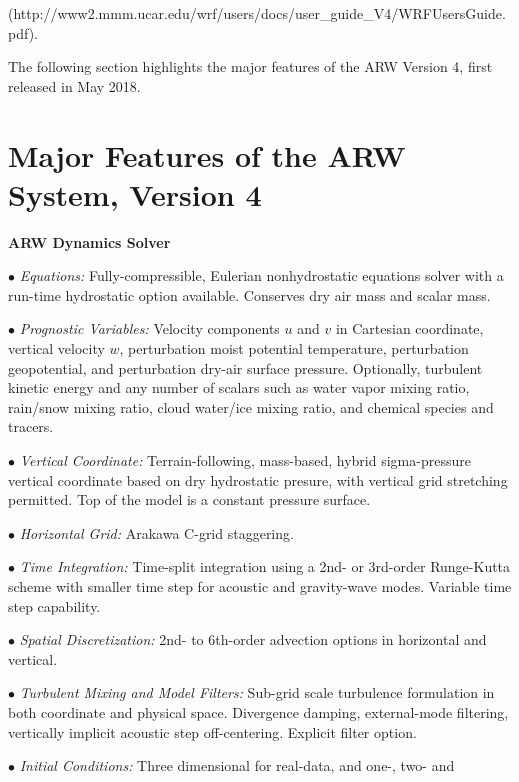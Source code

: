 {\noindent(http://www2.mmm.ucar.edu/wrf/users/docs/user\_guide\_V4/WRFUsersGuide.pdf).  }

The following section highlights the major features of the 
ARW Version 4, first released in May 2018.

\section {Major Features of the ARW System, Version 4}

\vskip 12pt
{\noindent\bf ARW Dynamics Solver}
\vskip 12pt

\begin{description}
\setlength{\itemsep}{-5pt}
\item{$\bullet$} {\em Equations:}
Fully-compressible, Eulerian nonhydrostatic equations solver with 
a run-time hydrostatic option available. Conserves dry air mass and scalar mass.
%
\item{$\bullet$} {\em Prognostic Variables:}
Velocity components $u$ and $v$ in Cartesian coordinate, vertical velocity $w$, 
perturbation moist potential temperature, perturbation geopotential, 
and perturbation dry-air surface pressure.
Optionally, turbulent kinetic energy and any number of scalars
such as water vapor mixing ratio, rain/snow mixing ratio,
cloud water/ice mixing ratio, and chemical species and tracers.
%
\item{$\bullet$} {\em Vertical Coordinate:}
Terrain-following, mass-based, hybrid sigma-pressure vertical coordinate based on dry hydrostatic presure, 
with vertical grid stretching permitted.
Top of the model is a constant pressure surface.
%
\item{$\bullet$} {\em Horizontal Grid:}
Arakawa C-grid staggering. 
%
\item{$\bullet$} {\em Time Integration:}
Time-split integration using a 2nd- or 3rd-order Runge-Kutta scheme with
smaller time step for acoustic and gravity-wave modes. 
Variable time step capability.
%
\item{$\bullet$} {\em Spatial Discretization:}
2nd- to 6th-order advection options in horizontal and vertical.
%
\item{$\bullet$} {\em Turbulent Mixing and Model Filters:} Sub-grid scale
turbulence formulation in both coordinate and physical space.
Divergence damping, external-mode filtering, vertically implicit
acoustic step off-centering. Explicit filter option.
%
\item{$\bullet$} {\em Initial Conditions:}
Three dimensional for real-data, and one-, two- and 

\end{description}

